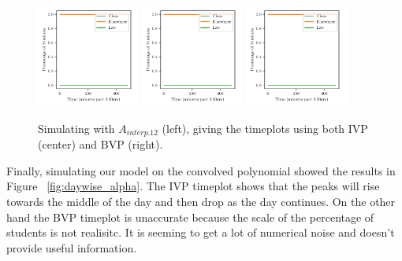 \documentclass[11pt]{amsart}
\begin{document}
\begin{figure}[htp]
    \centering
    \includegraphics[width=0.3\textwidth]{temp.pdf}\hfill
    \includegraphics[width=0.3\textwidth]{temp.pdf}\hfill
    \includegraphics[width=0.3\textwidth]{temp.pdf}\hfill
    \caption{Simulating with $A_{interp.12}$ (left), giving the timeplots using both IVP (center) and BVP (right).}
    \label{fig:continuous_alpha}

\end{figure}

Finally, simulating our model on the convolved polynomial showed the results in Figure ~\ref{fig:daywise_alpha}. The IVP timeplot shows that 
the peaks will rise towards the middle of the day and then drop as the day continues. On the other hand the BVP timeplot is unaccurate because the 
scale of the percentage of students is not realisitc. It is seeming to get a lot of numerical noise and doesn't provide useful information.
\end{document}
